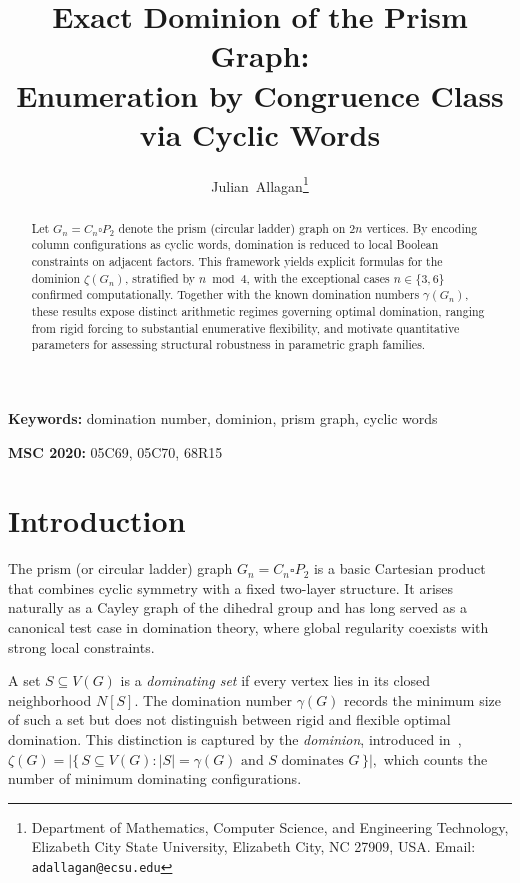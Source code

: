 \documentclass[11pt]{article}
\title{\textbf{Exact Dominion of the Prism Graph:\\
Enumeration by Congruence Class via Cyclic Words}}
\author{Julian~Allagan\thanks{Department of Mathematics, Computer Science, and Engineering Technology,
Elizabeth City State University, Elizabeth City, NC 27909, USA. 
Email: \texttt{adallagan@ecsu.edu}}
}
\date{}
\theoremstyle{plain}
\theoremstyle{definition}
\theoremstyle{remark}
\begin{document}
\maketitle
\begin{abstract}
Let $G_n=C_n\square P_2$ denote the prism (circular ladder) graph on $2n$ vertices.
By encoding column configurations as cyclic words, domination is reduced to local
Boolean constraints on adjacent factors.
This framework yields explicit formulas for the dominion $\zeta(G_n)$, stratified by
$n \bmod 4$, with the exceptional cases $n\in\{3,6\}$ confirmed computationally.
Together with the known domination numbers $\gamma(G_n)$, these results expose
distinct arithmetic regimes governing optimal domination, ranging from rigid forcing
to substantial enumerative flexibility, and motivate quantitative parameters for
assessing structural robustness in parametric graph families.
\end{abstract}

\vspace{0.3cm}
\noindent\textbf{Keywords:} domination number, dominion, prism graph, cyclic words

\vspace{0.3cm}
\noindent\textbf{MSC 2020:} 05C69, 05C70, 68R15

\section{Introduction}\label{sec:intro}

The prism (or circular ladder) graph $G_n = C_n \square P_2$
is a basic Cartesian product that combines cyclic symmetry with a fixed two-layer structure.
It arises naturally as a Cayley graph of the dihedral group and has long served as a
canonical test case in domination theory, where global regularity coexists with strong
local constraints.

A set $S\subseteq V(G)$ is a \emph{dominating set} if every vertex lies in its closed
neighborhood $N[S]$.  The domination number $\gamma(G)$ records the minimum size of such a
set but does not distinguish between rigid and flexible optimal domination.
This distinction is captured by the \emph{dominion}, introduced in~\cite{allagan-bobga-2021},
$
\zeta(G)=
\bigl|\{\,S\subseteq V(G): |S|=\gamma(G)\text{ and }S\text{ dominates }G\,\}\bigr|,
$
which counts the number of minimum dominating configurations.
\end{document}
